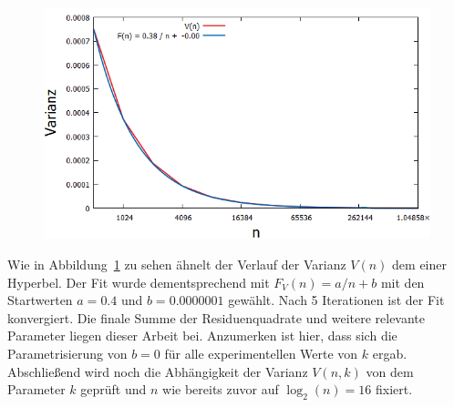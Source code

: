 \begin{figure}[H]
\begin{minipage}[t]{.30\textwidth}
        \includegraphics[width=1.21\textwidth]{pictures/min_filter_fit_V256_n.png}
        
    \end{minipage}
    \vspace*{-0.1cm}
    \label{fig: min_V_n}
\end{figure}

\noindent
Wie in Abbildung~\ref{fig: min_V_n} zu sehen ähnelt der Verlauf der Varianz $V(n)$ dem einer Hyperbel. Der Fit wurde dementsprechend mit $F_V(n)=a/n + b$ mit den Startwerten $a=0.4$ und $b=0.0000001$ gewählt. Nach 5 Iterationen ist der Fit konvergiert. Die finale Summe der Residuenquadrate und weitere relevante Parameter liegen dieser Arbeit bei. Anzumerken ist hier, dass
sich die Parametrisierung von $b=0$ für alle experimentellen Werte von $k$ ergab.\\[.1cm]

\noindent
Abschließend wird noch die Abhängigkeit der Varianz $V(n,k)$ von dem Parameter $k$ geprüft und $n$ wie bereits zuvor auf $\log_2(n)=16$ fixiert.

